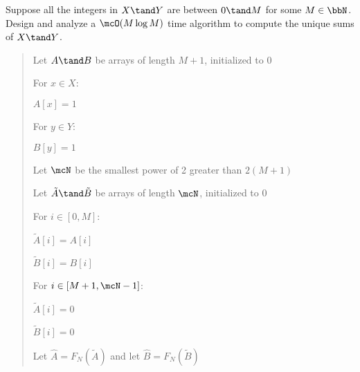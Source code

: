 \documentclass[10pt]{article}
\begin{document}
\begin{subexercise}
  \item Suppose all the integers in $ X\tand Y $ are between $ 0\tand M $ for some $ M\in \bbN $. Design and analyze a $ \mcO(M\log M) $ time algorithm to compute the unique sums of $ X\tand Y $.
\end{subexercise}

\begin{quote}


\begin{steps}
  \item Let $ A \tand B $ be arrays of length $ M+1 $, initialized to 0
  \item For $ x \in X $: 
  \begin{steps}
    \item $ A[x] = 1 $
  \end{steps}
  \item For $ y \in Y $: 
  \begin{steps}
    \item $ B[y] = 1 $
  \end{steps}
  \item Let $ \mcN $ be the smallest power of 2 greater than $ 2(M+1) $
  \item Let $ \tilde A \tand \tilde B $ be arrays of length $ \mcN $, initialized to 0
  \item For $ i \in [0,M] $: 
  \begin{steps}
    \item $ \tilde A[i] = A[i] $
    \item $ \tilde B[i] = B[i] $
  \end{steps}
  \item For $ i \in [M+1,\mcN-1] $: 
  \begin{steps}
    \item $ \tilde A[i] = 0 $
    \item $ \tilde B[i] = 0 $
  \end{steps}

  \item Let $ \hat A = F_N(\tilde A) $ and let $ \hat B = F_N(\tilde B) $ 


\end{steps}
\end{quote}
\end{document}
